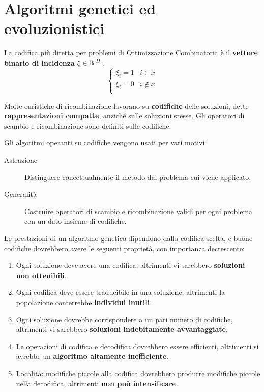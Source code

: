 \documentclass[\main/main.tex]{subfiles}
\begin{document}
\chapter{Algoritmi genetici ed evoluzionistici}
\begin{multicols}{2}
\begin{definition}
La codifica più diretta per problemi di Ottimizzazione Combinatoria è il \textbf{vettore binario di incidenza} \(\xi \in \mathbb{B}^{\left\lvert B\right\rvert}\):
\[
    \begin{cases}
        \xi_i = 1 & i \in x\\
        \xi_i = 0 & i \not\in x\\
    \end{cases}
\]
\end{definition}
\begin{observation}
    Molte euristiche di ricombinazione lavorano su \textbf{codifiche} delle soluzioni, dette \textbf{rappresentazioni compatte}, anziché sulle soluzioni stesse. Gli operatori di scambio e ricombinazione sono definiti sulle codifiche.
\end{observation}
\begin{observation}
    Gli algoritmi operanti su codifiche vengono usati per vari motivi:
    \begin{description}
    \item[Astrazione] Distinguere concettualmente il metodo dal problema cui viene applicato.
    \item[Generalità] Costruire operatori di scambio e ricombinazione validi per ogni problema con un dato insieme di codifiche.
    \end{description}
\end{observation}
\begin{observation}
    Le prestazioni di un algoritmo genetico dipendono dalla codifica scelta, e buone codifiche dovrebbero avere le seguenti proprietà, con importanza decrescente:
    \begin{enumerate}
        \item Ogni soluzione deve avere una codifica, altrimenti vi sarebbero \textbf{soluzioni non ottenibili}.
        \item Ogni codifica deve essere traducibile in una soluzione, altrimenti la popolazione conterrebbe \textbf{individui inutili}.
        \item Ogni soluzione dovrebbe corrispondere a un pari numero di codifiche, altrimenti vi sarebbero \textbf{soluzioni indebitamente avvantaggiate}.
        \item Le operazioni di codifica e decodifica dovrebbero essere efficienti, altrimenti si avrebbe un \textbf{algoritmo altamente inefficiente}.
        \item Località: modifiche piccole alla codifica dovrebbero produrre modifiche piccole nella decodifica, altrimenti \textbf{non può intensificare}.
    \end{enumerate}
    

\end{observation}
\end{multicols}
\end{document}
